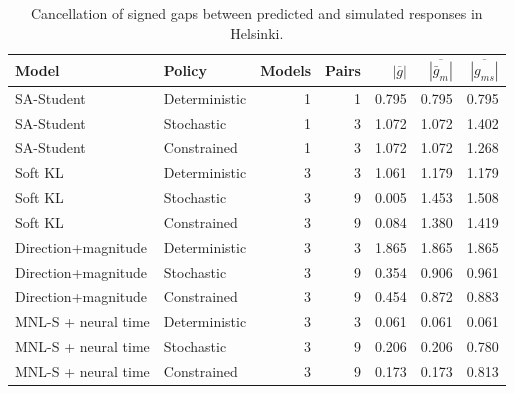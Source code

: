 \begin{table}[pos=htbp]
\centering\small
\caption{Cancellation of signed gaps between predicted and simulated responses in Helsinki.}
\label{tab:execution_gap_aggregation}
\setlength{\tabcolsep}{3pt}
\renewcommand{\arraystretch}{1.12}
\begin{tabular*}{\linewidth}{@{\extracolsep{\fill}}llrrrrr@{}}
\toprule
Model & Policy & Models & Pairs & $|\overline{g}|$ & $\overline{|\bar g_m|}$ & $\overline{|g_{ms}|}$ \\
\midrule
SA-Student & Deterministic & 1 & 1 & 0.795 & 0.795 & 0.795 \\
SA-Student & Stochastic & 1 & 3 & 1.072 & 1.072 & 1.402 \\
SA-Student & Constrained & 1 & 3 & 1.072 & 1.072 & 1.268 \\
Soft KL & Deterministic & 3 & 3 & 1.061 & 1.179 & 1.179 \\
Soft KL & Stochastic & 3 & 9 & 0.005 & 1.453 & 1.508 \\
Soft KL & Constrained & 3 & 9 & 0.084 & 1.380 & 1.419 \\
Direction+magnitude & Deterministic & 3 & 3 & 1.865 & 1.865 & 1.865 \\
Direction+magnitude & Stochastic & 3 & 9 & 0.354 & 0.906 & 0.961 \\
Direction+magnitude & Constrained & 3 & 9 & 0.454 & 0.872 & 0.883 \\
MNL-S + neural time & Deterministic & 3 & 3 & 0.061 & 0.061 & 0.061 \\
MNL-S + neural time & Stochastic & 3 & 9 & 0.206 & 0.206 & 0.780 \\
MNL-S + neural time & Constrained & 3 & 9 & 0.173 & 0.173 & 0.813 \\
\bottomrule
\end{tabular*}
\par{}
\end{table}
